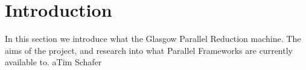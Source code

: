 \chapter{Introduction}

In this section we introduce what the Glasgow Parallel Reduction machine. The aims of the project, 
and research into what Parallel Frameworks are currently available to.
aTim Schafer




